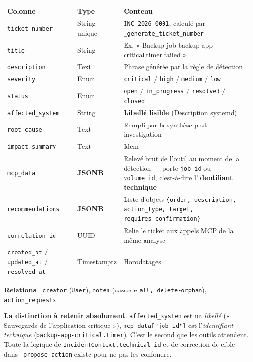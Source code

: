 \documentclass[11pt,a4paper]{report}
\newcommand{\fn}[1]{\texttt{\small\textcolor{oasisviolet}{#1}}}
\newcommand{\cls}[1]{\texttt{\small\textcolor{oasisblue}{#1}}}
\begin{document}
\begin{longtable}{@{}p{3.6cm}p{2.6cm}p{8.4cm}@{}}
\toprule
\textbf{Colonne} & \textbf{Type} & \textbf{Contenu}\\
\midrule
\endhead
\texttt{ticket\_number} & String unique & \texttt{INC-2026-0001}, calculé par \fn{\_generate\_ticket\_number}\\
\texttt{title} & String & Ex. « Backup job backup-app-critical.timer failed »\\
\texttt{description} & Text & Phrase générée par la règle de détection\\
\texttt{severity} & Enum & \texttt{critical} / \texttt{high} / \texttt{medium} / \texttt{low}\\
\texttt{status} & Enum & \texttt{open} / \texttt{in\_progress} / \texttt{resolved} / \texttt{closed}\\
\texttt{affected\_system} & String & \textbf{Libellé lisible} (Description systemd)\\
\texttt{root\_cause} & Text & Rempli par la synthèse post-investigation\\
\texttt{impact\_summary} & Text & Idem\\
\texttt{mcp\_data} & \textbf{JSONB} & Relevé brut de l'outil au moment de la détection --- porte \texttt{job\_id} ou \texttt{volume\_id}, c'est-à-dire l'\textbf{identifiant technique}\\
\texttt{recommendations} & \textbf{JSONB} & Liste d'objets \texttt{\{order, description, action\_type, target, requires\_confirmation\}}\\
\texttt{correlation\_id} & UUID & Relie le ticket aux appels MCP de la même analyse\\
\texttt{created\_at} / \texttt{updated\_at} / \texttt{resolved\_at} & Timestamptz & Horodatages\\
\bottomrule
\end{longtable}

\textbf{Relations} : \texttt{creator} (\cls{User}), \texttt{notes} (cascade
\texttt{all, delete-orphan}), \texttt{action\_requests}.

\begin{keybox}
\textbf{La distinction à retenir absolument.} \texttt{affected\_system} est un
\emph{libellé} (« Sauvegarde de l'application critique »),
\texttt{mcp\_data["job\_id"]} est l'\emph{identifiant technique}
(\texttt{backup-app-critical.timer}). C'est le second que les outils attendent.
Toute la logique de \fn{IncidentContext.technical\_id} et de correction de cible
dans \fn{\_propose\_action} existe pour ne pas les confondre.
\end{keybox}
\end{document}
